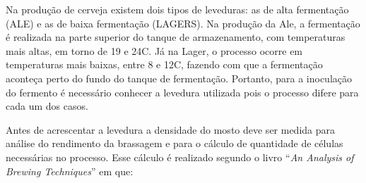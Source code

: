 Na produção de cerveja existem dois tipos de leveduras: as de alta fermentação (ALE) e as de baixa fermentação (LAGERS). Na produção da Ale, a fermentação é realizada na parte superior do tanque de armazenamento, com temperaturas mais altas, em torno de 19 e 24\textdegree C. Já na Lager, o processo ocorre em temperaturas mais baixas, entre 8 e 12\textdegree C, fazendo com que a fermentação aconteça perto do fundo do tanque de fermentação. Portanto, para a inoculação do fermento é necessário conhecer a levedura utilizada pois o processo difere para cada um dos casos.

Antes de acrescentar a levedura a densidade do mosto deve ser medida para análise do rendimento da brassagem e para o cálculo de quantidade de células necessárias no processo. Esse cálculo é realizado segundo o livro “\textit{An Analysis of Brewing Techniques}” em que:

